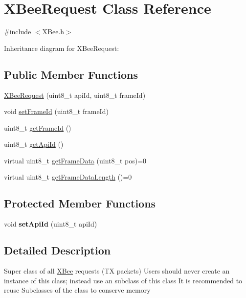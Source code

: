 \hypertarget{class_x_bee_request}{}\section{X\+Bee\+Request Class Reference}
\label{class_x_bee_request}


{\ttfamily \#include $<$X\+Bee.\+h$>$}



Inheritance diagram for X\+Bee\+Request\+:
\subsection*{Public Member Functions}
\begin{DoxyCompactItemize}
\item 
\hyperlink{class_x_bee_request_af80fd559cab746ab8573087cddda71a2}{X\+Bee\+Request} (uint8\+\_\+t api\+Id, uint8\+\_\+t frame\+Id)
\item 
void \hyperlink{class_x_bee_request_aed1724c11e710217807c971e40105c86}{set\+Frame\+Id} (uint8\+\_\+t frame\+Id)
\item 
uint8\+\_\+t \hyperlink{class_x_bee_request_a20394c7ea4666224c50bef25cc0cd836}{get\+Frame\+Id} ()
\item 
uint8\+\_\+t \hyperlink{class_x_bee_request_a746d0373c9fb6ed0ff8b7e04f5fb12c9}{get\+Api\+Id} ()
\item 
virtual uint8\+\_\+t \hyperlink{class_x_bee_request_ad5b998cd95a570bdaa4d74c6c8790d94}{get\+Frame\+Data} (uint8\+\_\+t pos)=0
\item 
virtual uint8\+\_\+t \hyperlink{class_x_bee_request_a03b6c558db5836fa7167c0fba7405642}{get\+Frame\+Data\+Length} ()=0
\end{DoxyCompactItemize}
\subsection*{Protected Member Functions}
\begin{DoxyCompactItemize}
\item 
\hypertarget{class_x_bee_request_aee756672e79dbb05358187cb53f61b1a}{}\label{class_x_bee_request_aee756672e79dbb05358187cb53f61b1a} 
void {\bfseries set\+Api\+Id} (uint8\+\_\+t api\+Id)
\end{DoxyCompactItemize}


\subsection{Detailed Description}
Super class of all \hyperlink{class_x_bee}{X\+Bee} requests (TX packets) Users should never create an instance of this class; instead use an subclass of this class It is recommended to reuse Subclasses of the class to conserve memory 

